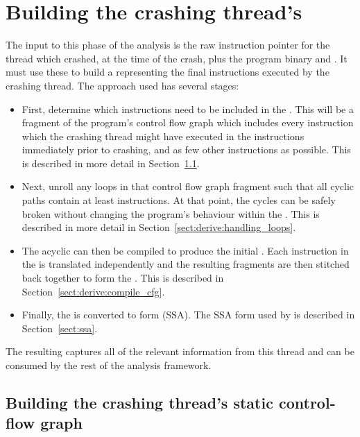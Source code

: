 \section{Building the crashing thread's \StateMachine}

The input to this phase of the analysis is the raw instruction pointer
for the thread which crashed, at the time of the crash, plus the
program binary and .  It must use these to
build a {\StateMachine} representing the final \backref{$\alpha$}
instructions executed by the crashing thread.  The approach used has
several stages:

\begin{itemize}
\item First, determine which instructions need to be included in the
  {\StateMachine}.  This will be a fragment of the program's control
  flow graph which includes every instruction which the crashing
  thread might have executed in the \backref{$\alpha$} instructions
  immediately prior to crashing, and as few other instructions as
  possible.  This is described in more detail in
  Section~\ref{sect:derive:build_static_cfg}.
\item Next, unroll any loops in that control flow graph fragment such
  that all cyclic paths contain at least \backref{$\alpha$}
  instructions.  At that point, the cycles can be safely broken
  without changing the program's behaviour within the
  .  This is described in more detail in
  Section~\ref{sect:derive:handling_loops}.
\item The acyclic  can then be compiled to produce the
  initial {\StateMachine}.  Each instruction in the  is
  translated independently and the resulting fragments are then
  stitched back together to form the {\StateMachine}.  This is
  described in Section~\ref{sect:derive:compile_cfg}.
\item Finally, the {\StateMachine} is converted to
   form (SSA).  The SSA form
  used by {\technique} is described in Section~\ref{sect:ssa}.
\end{itemize}

The resulting {\StateMachine} captures all of the relevant information
from this thread and can be consumed by the rest of the analysis
framework.

\subsection{Building the crashing thread's static control-flow graph}
\label{sect:derive:build_static_cfg}

